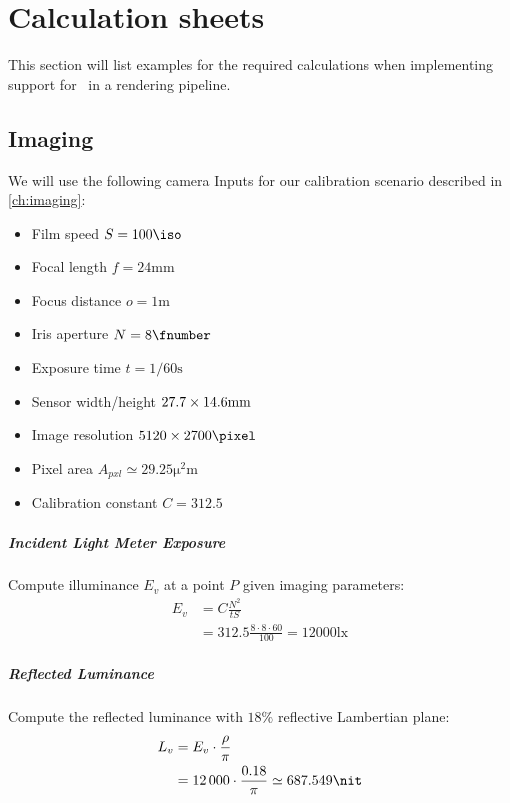 
\chapter{Calculation sheets}\label{ch:calcsheets}

This section will list examples for the required calculations when implementing
support for \physLight\ in a rendering pipeline.

\section{Imaging}\label{ch:calc_calibration}

We will use the following camera Inputs for our calibration scenario described
in \cref{ch:imaging}:
\begin{itemize}
\item Film speed $S = \num{100}\unit{\iso}$
\item Focal length $f = \num{24}\unit{\milli\meter}$
\item Focus distance $o = \num{1}\unit{\meter}$
\item Iris aperture $N = \num{8}\unit{\fnumber}$
\item Exposure time $t = 1/60\unit{\second}$
\item Sensor width/height $\numproduct{27.7 x 14.6}\unit{\milli\meter}$ 
\item Image resolution $\numproduct{5120 x 2700}\unit{\pixel}$ 
\item Pixel area $A_{pxl} \simeq \num{29.25}\unit{\square\micro\meter}$
\item Calibration constant $C = 312.5$
\end{itemize}

\paragraph{Incident Light Meter Exposure}
Compute illuminance $E_v$ at a point $P$ given imaging parameters:
\begin{align*}
E_v& = C\frac{N^2}{t S}\\
&= 312.5\frac{8\cdot 8 \cdot 60}{100} = \num{12000}\unit{\lux}
\end{align*}

\paragraph{Reflected Luminance}
Compute the reflected luminance with $18\%$ reflective Lambertian plane:
\begin{align*}
L_v& = E_v\cdot \frac{\rho}{\pi} \\
&= \num{12000} \cdot \frac{0.18}{\pi}
\simeq \num{687.549}\unit{\nit}
\end{align*}

